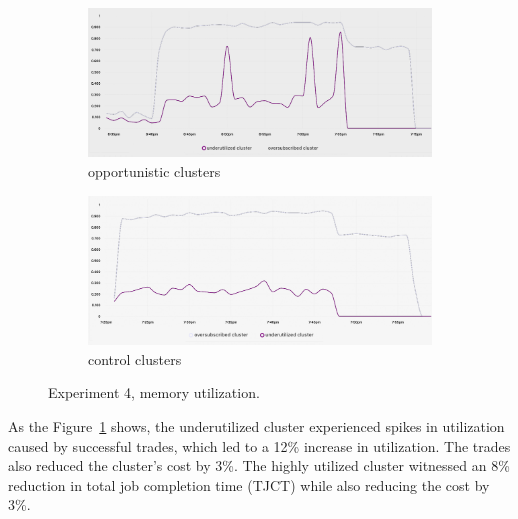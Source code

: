 \begin{figure}[H]
\centering
\begin{subfigure}{.5\textwidth}
  \centering
  \includegraphics[width=.9\linewidth]{./figures/experiment-four/exp4-incentives-2.png}
  \caption{opportunistic clusters}
  \label{fig:exp4oop}
\end{subfigure}%
\begin{subfigure}{.5\textwidth}
  \centering
  \includegraphics[width=.9\linewidth]{./figures/experiment-four/exp4-incentives-control-2.png}
  \caption{control clusters}
  \label{fig:exp4control}
\end{subfigure}
\caption{Experiment 4, memory utilization.}
\label{fig:exp4memutil}
\end{figure}

As the Figure~\ref{fig:exp4oop} shows, the underutilized cluster experienced spikes in
utilization caused by successful trades, which led to a 12\% increase in
utilization. The trades also reduced the cluster's cost by 3\%. The highly
utilized cluster witnessed an 8\% reduction in total job completion time (TJCT)
while also reducing the cost by 3\%.

